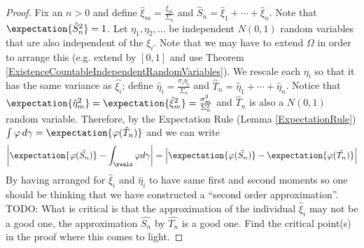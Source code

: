 \begin{proof}
Fix an $n >0$ and define $\hat{\xi}_m = \frac{\xi_m}{\Sigma_n}$ and
$\hat{S}_n = \hat{\xi}_1 + \cdots + \hat{\xi}_n$.  Note that
$\expectation{\hat{S}_n^2} = 1$.  Let $\eta_1, \eta_2, \dots$ be independent $N(0,1)$ random variables
that are also independent of the $\xi_i$.  Note that we may have to
extend $\Omega$ in order to arrange this (e.g. extend by $[0,1]$ and
use Theorem \ref{ExistenceCountableIndependentRandomVariables}).  We
rescale each $\eta_i$ so that it has the same variance as
$\hat{\xi_i}$; define $\hat{\eta}_i =
\frac{\sigma_i \eta_i}{\Sigma_n}$ and $\hat{T}_n = \hat{\eta}_1 +
\cdots + \hat{\eta}_n$.  Notice that
$\expectation{\hat{\eta}_m^2} =
\expectation{\hat{\xi}_m^2} = \frac{\sigma_m^2}{\Sigma_n^2}$ and $\hat{T}_n$ is also a $N(0,1)$
random variable.  Therefore, by the Expectation Rule (Lemma
\ref{ExpectationRule}) $\int \varphi \, d\gamma =
\expectation{\varphi(\hat{T}_n)}$ and we can write 
\begin{align*}
\left \lvert \expectation{\varphi(\hat{S_n})} - \int_\reals \varphi
  d\gamma \right \rvert = \left \lvert \expectation{\varphi(\hat{S_n})} - \expectation{\varphi(\hat{T_n})} \right \rvert
\end{align*}
By having arranged for $\hat{\xi}_i$ and $\hat{\eta}_i$ to have same
first and second moments so one should be thinking that we have
constructed a ``second order approximation''.  TODO: What is critical
is that the approximation of the individual $\hat{\xi}_i$ may not be a
good one, the approximation $\hat{S_n}$ by $\hat{T_n}$ is a good one.
Find the critical point(s) in the proof where this comes to light.


\end{proof}

